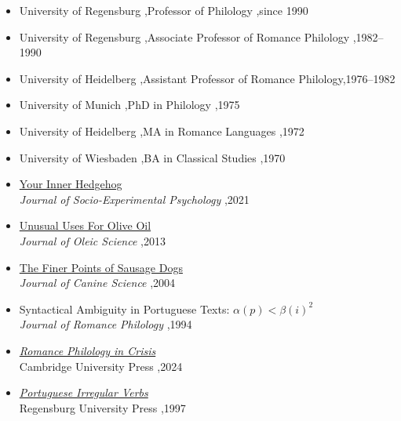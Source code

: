 \documentclass[letterpaper,10pt]{article}
\begin{document}


\begin{itemize}
\item University of Regensburg \sep Professor of Philology \sep since 1990
\item University of Regensburg \sep Associate Professor of Romance Philology \sep 1982--1990
\item University of Heidelberg \sep Assistant Professor of Romance Philology\sep 1976--1982
\end{itemize}


\begin{itemize}
\item University of Munich \sep PhD in Philology \sep 1975
\item University of Heidelberg \sep MA in Romance Languages \sep 1972
\item University of Wiesbaden \sep BA in Classical Studies \sep 1970
\end{itemize}


\begin{itemize}
\item \href{https://pascalmichaillat.org/hugo-website/papers/paper3/}{Your Inner Hedgehog} \\
\textit{Journal of Socio-Experimental Psychology} \sep 2021
\item \href{https://pascalmichaillat.org/hugo-website/papers/paper1/}{Unusual Uses For Olive Oil} \\
\textit{Journal of Oleic Science} \sep 2013
\item \href{https://pascalmichaillat.org/hugo-website/papers/paper2/}{The Finer Points of Sausage Dogs} \\
\textit{Journal of Canine Science} \sep 2004
\item Syntactical Ambiguity in Portuguese Texts: $\alpha(p)<\beta(i)^2$ \\
\textit{Journal of Romance Philology} \sep 1994
\end{itemize}


\begin{itemize}
\item \href{http://www.alexandermccallsmith.com/book/portuguese-irregular-verbs}{\textit{Romance Philology in Crisis}}  \\
Cambridge University Press \sep 2024
\item \href{https://pascalmichaillat.org/hugo-website/books/book1/}{\textit{Portuguese Irregular Verbs}}\\
Regensburg University Press \sep 1997
\end{itemize}
\end{document}
